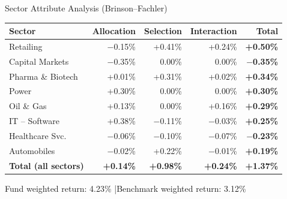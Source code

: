 \documentclass[11pt, aspectratio=43]{beamer}
\begin{document}
\begin{frame}{Sector Attribute Analysis (Brinson--Fachler)}
\centering
\footnotesize
\begin{tabular}{l r r r r}
\toprule
\textbf{Sector} & \textbf{Allocation} & \textbf{Selection} & \textbf{Interaction} & \textbf{Total} \\
\midrule
\rowcolor{lightgray}
Retailing & $-$0.15\% & \textcolor{posgreen}{+0.41\%} & +0.24\% & \textcolor{posgreen}{\textbf{+0.50\%}} \\
Capital Markets & \textcolor{negred}{$-$0.35\%} & 0.00\% & 0.00\% & \textcolor{negred}{\textbf{$-$0.35\%}} \\
\rowcolor{lightgray}
Pharma \& Biotech & +0.01\% & \textcolor{posgreen}{+0.31\%} & +0.02\% & \textcolor{posgreen}{\textbf{+0.34\%}} \\
Power & \textcolor{posgreen}{+0.30\%} & 0.00\% & 0.00\% & \textcolor{posgreen}{\textbf{+0.30\%}} \\
\rowcolor{lightgray}
Oil \& Gas & +0.13\% & 0.00\% & +0.16\% & \textcolor{posgreen}{\textbf{+0.29\%}} \\
IT -- Software & \textcolor{posgreen}{+0.38\%} & $-$0.11\% & $-$0.03\% & \textcolor{posgreen}{\textbf{+0.25\%}} \\
\rowcolor{lightgray}
Healthcare Svc. & $-$0.06\% & \textcolor{negred}{$-$0.10\%} & $-$0.07\% & \textcolor{negred}{\textbf{$-$0.23\%}} \\
Automobiles & $-$0.02\% & \textcolor{posgreen}{+0.22\%} & $-$0.01\% & \textcolor{posgreen}{\textbf{+0.19\%}} \\
\midrule
\textbf{Total (all sectors)} & \textbf{+0.14\%} & \textbf{+0.98\%} & \textbf{+0.24\%} & \textbf{+1.37\%} \\
\bottomrule
\end{tabular}

\vspace{0.5em}
\footnotesize
Fund weighted return: 4.23\% \quad|\quad Benchmark weighted return: 3.12\%
\end{frame}
\end{document}

